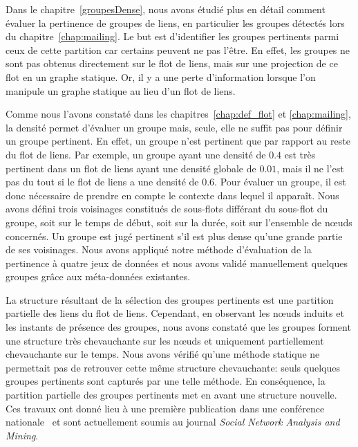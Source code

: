 \bigskip

Dans le chapitre~\ref{groupesDense}, nous avons étudié plus en détail comment évaluer la pertinence de groupes de liens, en particulier les groupes détectés lors du chapitre~\ref{chap:mailing}.
Le but est d'identifier les groupes pertinents parmi ceux de cette partition car certains peuvent ne pas l'être.
En effet, les groupes ne sont pas obtenus directement sur le flot de liens, mais sur une projection de ce flot en un graphe statique.
Or, il y a une perte d'information lorsque l'on manipule un graphe statique au lieu d'un flot de liens.

Comme nous l'avons constaté dans les chapitres~\ref{chap:def_flot} et \ref{chap:mailing}, la densité permet d'évaluer un groupe mais, seule, elle ne suffit pas pour définir un groupe pertinent.
En effet, un groupe n'est pertinent que par rapport au reste du flot de liens.
Par exemple, un groupe ayant une densité de $0.4$ est très pertinent dans un flot de liens ayant une densité globale de $0.01$, mais il ne l'est pas du tout si le flot de liens a une densité de $0.6$.
Pour évaluer un groupe, il est donc nécessaire de prendre en compte le contexte dans lequel il apparaît.
Nous avons défini trois voisinages constitués de sous-flots différant du sous-flot du groupe, soit sur le temps de début, soit sur la durée, soit sur l'ensemble de n\oe{}uds concernés.
Un groupe est jugé pertinent s'il est plus dense qu'une grande partie de ses voisinages.
Nous avons appliqué notre méthode d'évaluation de la pertinence à quatre jeux de données et nous avons validé manuellement quelques groupes grâce aux méta-données existantes.

La structure résultant de la sélection des groupes pertinents est une partition partielle des liens du flot de liens.
Cependant, en observant les n\oe{}uds induits et les instants de présence des groupes, nous avons constaté que les groupes forment une structure très chevauchante sur les n\oe{}uds et uniquement partiellement chevauchante sur le temps.
Nous avons vérifié qu'une méthode statique ne permettait pas de retrouver cette même structure chevauchante: seuls quelques groupes pertinents sont capturés par une telle méthode.
En conséquence, la partition partielle des groupes pertinents met en avant une structure nouvelle.
Ces travaux ont donné lieu à une première publication dans une conférence nationale~\cite{gaumont:hal-01305118} et sont actuellement soumis au journal \emph{Social Network Analysis and Mining}.


\bigskip

